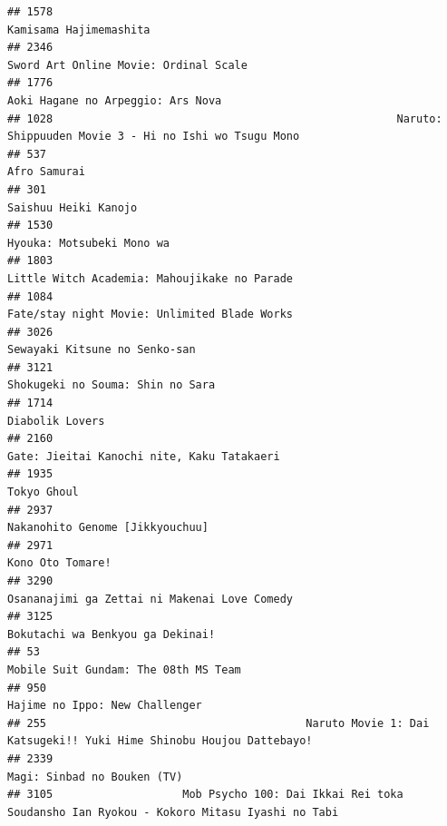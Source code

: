 \documentclass[
]{article}
\begin{document}
\begin{verbatim}
## 1578                                                                                    Kamisama Hajimemashita
## 2346                                                                     Sword Art Online Movie: Ordinal Scale
## 1776                                                                         Aoki Hagane no Arpeggio: Ars Nova
## 1028                                                     Naruto: Shippuuden Movie 3 - Hi no Ishi wo Tsugu Mono
## 537                                                                                               Afro Samurai
## 301                                                                                       Saishuu Heiki Kanojo
## 1530                                                                                 Hyouka: Motsubeki Mono wa
## 1803                                                              Little Witch Academia: Mahoujikake no Parade
## 1084                                                              Fate/stay night Movie: Unlimited Blade Works
## 3026                                                                             Sewayaki Kitsune no Senko-san
## 3121                                                                          Shokugeki no Souma: Shin no Sara
## 1714                                                                                           Diabolik Lovers
## 2160                                                                Gate: Jieitai Kanochi nite, Kaku Tatakaeri
## 1935                                                                                               Tokyo Ghoul
## 2937                                                                           Nakanohito Genome [Jikkyouchuu]
## 2971                                                                                          Kono Oto Tomare!
## 3290                                                              Osananajimi ga Zettai ni Makenai Love Comedy
## 3125                                                                          Bokutachi wa Benkyou ga Dekinai!
## 53                                                                        Mobile Suit Gundam: The 08th MS Team
## 950                                                                             Hajime no Ippo: New Challenger
## 255                                        Naruto Movie 1: Dai Katsugeki!! Yuki Hime Shinobu Houjou Dattebayo!
## 2339                                                                               Magi: Sinbad no Bouken (TV)
## 3105                    Mob Psycho 100: Dai Ikkai Rei toka Soudansho Ian Ryokou - Kokoro Mitasu Iyashi no Tabi

\end{verbatim}
\end{document}
